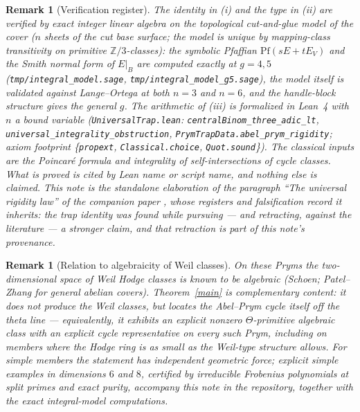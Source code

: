 \documentclass[11pt]{article}
\newtheorem{remark}[theorem]{Remark}
\newcommand{\Z}{\mathbb{Z}}
\newcommand{\Pf}{\mathrm{Pf}}
\begin{document}
\begin{remark}[Verification register]
The identity in (i) and the type in (ii) are verified by exact integer linear
algebra on the topological cut-and-glue model of the cover
($n$ sheets of the cut base surface; the model is unique by mapping-class
transitivity on primitive $\Z/3$-classes): the symbolic Pfaffian
$\Pf(sE+tE_V)$ and the Smith normal form of $E|_B$ are computed exactly at
$g=4,5$ (\texttt{tmp/integral\_model.sage},
\texttt{tmp/integral\_model\_g5.sage}), the model itself is validated against
Lange--Ortega at both $n=3$ and $n=6$, and the handle-block structure gives
the general $g$.  The arithmetic of (iii) is formalized in Lean~4 with $n$ a
bound variable (\texttt{UniversalTrap.lean}:
\texttt{centralBinom\_three\_adic\_lt},
\texttt{universal\_integrality\_obstruction},
\texttt{PrymTrapData.abel\_prym\_rigidity}; axiom footprint
\{\texttt{propext}, \texttt{Classical.choice}, \texttt{Quot.sound}\}).
The classical inputs are the Poincar\'e formula and integrality of
self-intersections of cycle classes.  What is proved is cited by Lean name or
script name, and nothing else is claimed.  This note is the standalone
elaboration of the paragraph ``The universal rigidity law'' of the companion
paper \cite{Companion}, whose registers and falsification record it inherits:
the trap identity was found while pursuing --- and retracting, against the
literature --- a stronger claim, and that retraction is part of this note's
provenance.
\end{remark}

\begin{remark}[Relation to algebraicity of Weil classes]
On these Pryms the two-dimensional space of Weil Hodge classes is known to be
algebraic (Schoen; Patel--Zhang \cite{PZ26} for general abelian covers).
Theorem~\ref{main} is complementary content: it does not produce the Weil
classes, but locates the Abel--Prym cycle itself off the theta line ---
equivalently, it exhibits an explicit nonzero $\Theta$-primitive algebraic
class with an explicit cycle representative on every such Prym, including on
members where the Hodge ring is as small as the Weil-type structure allows.
For \emph{simple} members the statement has independent geometric force;
explicit simple examples in dimensions $6$ and $8$, certified by irreducible
Frobenius polynomials at split primes and exact purity, accompany this note
in the repository, together with the exact integral-model computations.
\end{remark}
\end{document}
